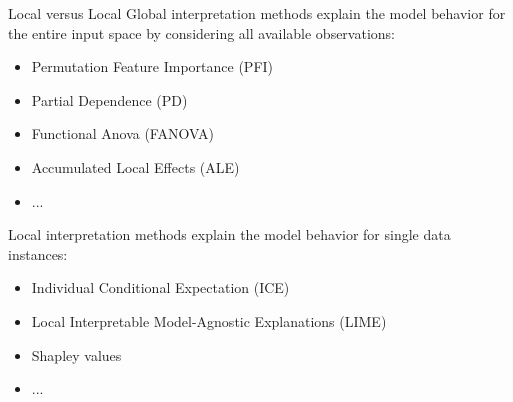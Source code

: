 \documentclass[11pt,compress,t,notes=noshow, xcolor=table]{beamer}
\begin{document}
	
	


	


\begin{vbframe}{Local versus Local}
Global interpretation methods explain the model behavior for the entire input space by considering all available observations:
	\begin{itemize}
		\item Permutation Feature Importance (PFI)
		\item Partial Dependence (PD)
		\item Functional Anova (FANOVA)
		\item Accumulated Local Effects (ALE)
		\item ...
	\end{itemize}
\bigskip
Local interpretation methods explain the model behavior for single data instances:
	\begin{itemize}
		\item Individual Conditional Expectation (ICE)
		\item Local Interpretable Model-Agnostic Explanations (LIME)
		\item Shapley values
		\item ...
	\end{itemize}
\end{vbframe}
\end{document}
